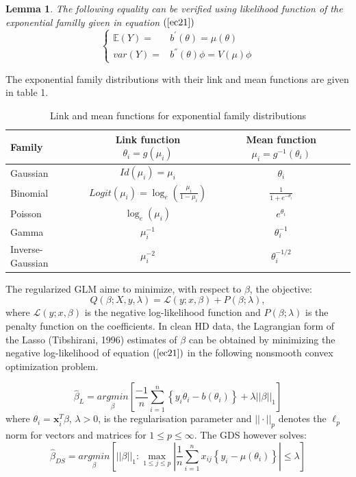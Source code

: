 \documentclass[a4paper,12pt,openany]{report}
\theoremstyle{plain}
\newtheorem{lemma}{\textbf{Lemma}}[chapter]
\theoremstyle{plain}
\theoremstyle{plain}
\theoremstyle{plain}
\theoremstyle{plain}
\theoremstyle{plain}
\theoremstyle{plain}
\theoremstyle{plain}
\theoremstyle{plain}
\theoremstyle{plain}
\theoremstyle{plain}
\theoremstyle{plain}
\begin{document}
\begin{lemma}
	The following equality can be verified using likelihood function of the exponential familly given in equation $(\ref{ec21})$
	\begin{equation}
	\left\lbrace\begin{array}{ll}
	\mathbb{E}(Y) =& b^{'}(\theta)=\mu(\theta)\\
	var(Y) =& b^{''}(\theta)\phi = V(\mu)\phi
	\end{array}\right.
	\end{equation}
\end{lemma}
The exponential family distributions with their link and mean functions are given in table 1.

\begin{table}\label{tc21}\centering
	\begin{tabular}{l|c|c}
		\hline
		Family & Link function $\theta_i=g(\mu_i)$ & Mean function $\mu_i = g^{-1}(\theta_i)$\\
		\hline
		Gaussian & $ Id(\mu_i) =\mu_i$ & $\theta_i$\\
		
		Binomial & $Logit(\mu_i)=\log_e\left(\frac{\mu_i}{1-\mu_i}\right)$ & $\frac{1}{1+e^{-\theta_i}}$\\
		Poisson & $\log_e(\mu_i)$ & $e^{\theta_i}$\\
		Gamma & $\mu_i^{-1}$ & $\theta_i^{-1}$\\
		Inverse-Gaussian & $\mu_i^{-2}$ & $\theta_i^{-1/2}$\\
		\hline
	\end{tabular}
	\caption{Link and mean functions for exponential family distributions}
\end{table}
The regularized GLM aime to minimize, with respect to $\beta$, the objective:
\begin{equation}
Q(\beta; X, y, \lambda) = \mathcal{L}(y; x, \beta) + P(\beta;\lambda),
\end{equation}
where $\mathcal{L}(y; x, \beta)$ is the negative log-likelihood function and $P(\beta;\lambda)$ is the penalty function on the coefficients. In clean HD data, the Lagrangian form of the Lasso (Tibshirani, 1996) estimates of $\beta$ can be obtained by minimizing the negative log-likelihood of equation $(\ref{ec21})$ in the following nonsmooth convex optimization problem.

\begin{equation}\label{ec23}
\hat{\beta}_{L} = \underset{\beta}{argmin}\left[\frac{-1}{n}\sum_{i=1}^{n}\left\lbrace y_i\theta_i-b\left(\theta_i\right)\right\rbrace + \lambda||\beta||_1\right]
\end{equation}
where $\theta_i=\mathbf{x}_i^T\beta$, $\lambda > 0$, is the regularisation parameter and $||\cdot||_p$ denotes the $\ell_p$ norm for vectors and matrices for $1\leq p\leq\infty$. The GDS however solves:
\begin{equation}\label{ec24}
\hat{\beta}_{DS} = \underset{\beta}{argmin}\left[||\beta||_1 : \underset{1\leq j\leq p}{\max} \left|\frac{1}{n}\sum_{i=1}^{n}x_{ij}\left\lbrace y_i-\mu\left(\theta_i\right)\right\rbrace\right| \leq \lambda\right]
\end{equation}
\end{document}
